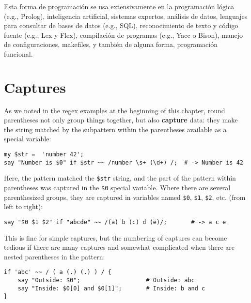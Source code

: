 
Esta forma de programación se usa extensivamente en la
programación lógica (e.g., Prolog), inteligencia artificial,
sistemas expertos, análisis de datos, lenguajes para
consultar de bases de datos (e.g., SQL), reconocimiento de
texto y código fuente (e.g., Lex y Flex), compilación de
programas (e.g., Yacc o Bison), manejo de configuraciones, 
makefiles, y también de alguna forma, programación funcional.


\section{Captures}

As we noted in the regex examples at the beginning of this 
chapter, round parentheses not only group things together, 
but also {\bf capture} data: they make the string matched 
by the subpattern within the parentheses available as a 
special variable:

\begin{verbatim}
my $str =  'number 42';
say "Number is $0" if $str ~~ /number \s+ (\d+) /;  # -> Number is 42
\end{verbatim}
%

Here, the pattern matched the \verb'$str' string, and the 
part of the pattern within parentheses was captured in 
the \verb'$0' special variable. Where there are several 
parenthesized groups, they are captured in variables 
named \verb'$0', \verb'$1',  \verb'$2', etc. (from 
left to right):

\begin{verbatim}
say "$0 $1 $2" if "abcde" ~~ /(a) b (c) d (e)/;       # -> a c e
\end{verbatim}
%

This is fine for simple captures, but the numbering of 
captures can become tedious if there are many captures and 
somewhat complicated when there are nested parentheses in 
the pattern:

\begin{verbatim}
if 'abc' ~~ / ( a (.) (.) ) / {
    say "Outside: $0";                   # Outside: abc
    say "Inside: $0[0] and $0[1]";       # Inside: b and c
}
\end{verbatim}

